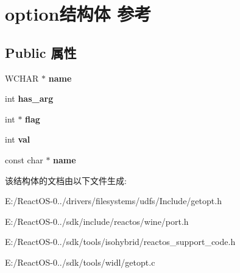 \hypertarget{structoption}{}\section{option结构体 参考}
\label{structoption}
\subsection*{Public 属性}
\begin{DoxyCompactItemize}
\item 
\mbox{\label{structoption_ae02f2d0cea6af34951d9008be8bfa625}} 
W\+C\+H\+AR $\ast$ {\bfseries name}
\item 
\mbox{\label{structoption_a90d7ee9a51eea5c002682dbd0af149e4}} 
int {\bfseries has\+\_\+arg}
\item 
\mbox{\label{structoption_a24ad4639d5d498fdc1c5b38bcaabc263}} 
int $\ast$ {\bfseries flag}
\item 
\mbox{\label{structoption_a13bd155ec3b405d29c41ab8d0793be11}} 
int {\bfseries val}
\item 
\mbox{\label{structoption_adc503659d37af8017fb4b86d61c99086}} 
const char $\ast$ {\bfseries name}
\end{DoxyCompactItemize}


该结构体的文档由以下文件生成\+:\begin{DoxyCompactItemize}
\item 
E\+:/\+React\+O\+S-\/0../drivers/filesystems/udfs/\+Include/getopt.\+h\item 
E\+:/\+React\+O\+S-\/0../sdk/include/reactos/wine/port.\+h\item 
E\+:/\+React\+O\+S-\/0../sdk/tools/isohybrid/reactos\+\_\+support\+\_\+code.\+h\item 
E\+:/\+React\+O\+S-\/0../sdk/tools/widl/getopt.\+c\end{DoxyCompactItemize}
